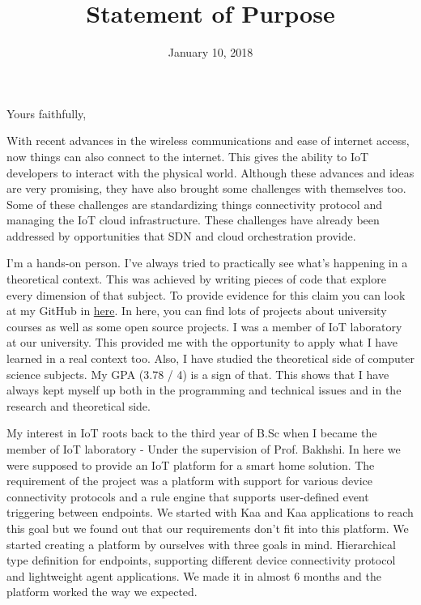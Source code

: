 \documentclass[11pt,a4paper,sans]{moderncv}        %
\title{Statement of Purpose}                               %
\begin{document}
\date{January 10, 2018}
\opening{}
\closing{Yours faithfully,}

\makelettertitle


With recent advances in the wireless communications and ease of internet access,
now things can also connect to the internet. This gives the ability to IoT
developers to interact with the physical world. Although these advances and ideas
are very promising, they have also brought some challenges with themselves too.
Some of these challenges are standardizing things connectivity protocol and
managing the IoT cloud infrastructure. These challenges have already been addressed by
opportunities that SDN and cloud orchestration provide.

I'm a hands-on person. I've always tried to practically see what's happening
in a theoretical context. This was achieved by writing pieces of code that explore
every dimension of that subject. To provide evidence for this claim you can
look at my GitHub in \href{https://github.com/Tabrizian}{here}. In
here, you can find lots of projects about university courses as well as some
open source projects. I was a member of IoT laboratory at our university. This
provided me with the opportunity to apply what I have learned in a real context too.
Also, I have studied the theoretical side of computer science subjects.
My GPA (3.78 / 4) is a sign of that. This shows that I have always kept
myself up both in the programming and technical issues and in the research and
theoretical side.

My interest in IoT roots back to the third year of B.Sc when I became the member
of IoT laboratory - Under the supervision of Prof. Bakhshi.
In here we were supposed to provide an IoT platform for
a smart home solution. The requirement of the project was a platform with
support for various device connectivity protocols and a rule engine that
supports user-defined event triggering between endpoints. We started with Kaa
and Kaa applications to reach this goal but we found out that our requirements
don't fit into this platform. We started creating a platform by ourselves
with three goals in mind. Hierarchical type definition for endpoints,
supporting different device connectivity protocol and lightweight
agent applications. We made it in almost 6 months and the platform worked the
way we expected.
\end{document}
